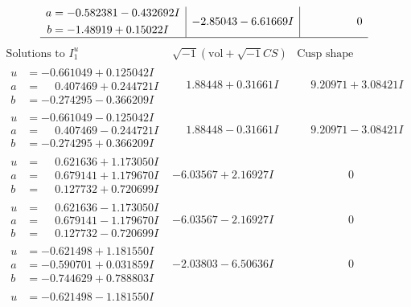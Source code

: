 \documentclass[1p]{elsarticle_modified}
\theoremstyle{definition}
\newcommand{\I}{\sqrt{-1}}
\begin{document}
$$\begin{array}{c|c|c}
\begin{aligned}
a &= -0.582381 - 0.432692 I \\
b &= -1.48919 + 0.15022 I\end{aligned}
 & -2.85043 - 6.61669 I & \phantom{-0.000000 } 0\\
 \hline 
 \end{array}$$\newpage$$\begin{array}{c|c|c}  
\text{Solutions to }I^u_{1}& \I (\text{vol} + \sqrt{-1}CS) & \text{Cusp shape}\\
 \hline 
\begin{aligned}
u &= -0.661049 + 0.125042 I \\
a &= \phantom{-}0.407469 + 0.244721 I \\
b &= -0.274295 - 0.366209 I\end{aligned}
 & \phantom{-}1.88448 + 0.31661 I & \phantom{-}9.20971 + 3.08421 I \\ \hline\begin{aligned}
u &= -0.661049 - 0.125042 I \\
a &= \phantom{-}0.407469 - 0.244721 I \\
b &= -0.274295 + 0.366209 I\end{aligned}
 & \phantom{-}1.88448 - 0.31661 I & \phantom{-}9.20971 - 3.08421 I \\ \hline\begin{aligned}
u &= \phantom{-}0.621636 + 1.173050 I \\
a &= \phantom{-}0.679141 + 1.179670 I \\
b &= \phantom{-}0.127732 + 0.720699 I\end{aligned}
 & -6.03567 + 2.16927 I & \phantom{-0.000000 } 0 \\ \hline\begin{aligned}
u &= \phantom{-}0.621636 - 1.173050 I \\
a &= \phantom{-}0.679141 - 1.179670 I \\
b &= \phantom{-}0.127732 - 0.720699 I\end{aligned}
 & -6.03567 - 2.16927 I & \phantom{-0.000000 } 0 \\ \hline\begin{aligned}
u &= -0.621498 + 1.181550 I \\
a &= -0.590701 + 0.031859 I \\
b &= -0.744629 + 0.788803 I\end{aligned}
 & -2.03803 - 6.50636 I & \phantom{-0.000000 } 0 \\ \hline\begin{aligned}
u &= -0.621498 - 1.181550 I \\

\end{aligned}
\end{array}$$
\end{document}
